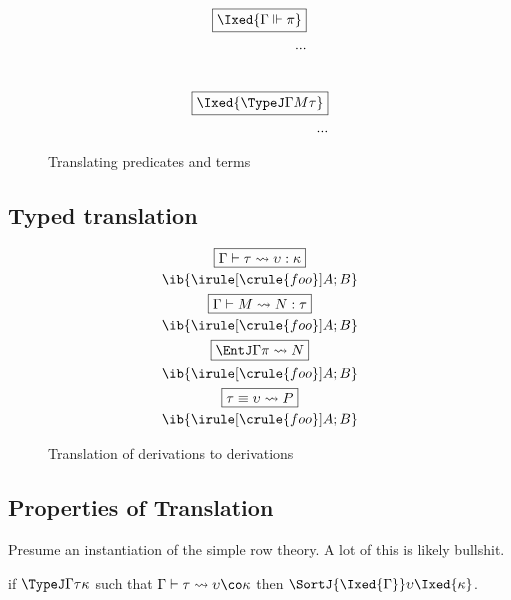 \documentclass[authoryear,acmsmall,screen]{acmart}
\begin{document}
\begin{figure}[H]
\begin{align*}
\fbox{$\Ixed{\Gamma \Vdash \pi}$} \\
\vspace{5em}
...
\end{align*} \\
\begin{align*}
\fbox{$\Ixed{\TypeJ \Gamma M \tau}$} \\
\vspace{5em}
...
\end{align*}
\caption{Translating predicates and terms}
\label{fig:translation}
\end{figure}

\subsection{Typed translation}

\begin{figure}[H]
\small
\begin{gather*}
\fbox{$\Gamma \vdash \tau \leadsto \upsilon : \kappa$}
\\
\ib{\irule[\crule{foo}]{A};{B}} \\
\fbox{$\Gamma \vdash M \leadsto N : \tau$}
\\
\ib{\irule[\crule{foo}]{A};{B}} \\
\fbox{${\EntJ \Gamma \pi} \leadsto N$}
\\
\ib{\irule[\crule{foo}]{A};{B}}  \\
\fbox{${\tau \equiv \upsilon} \leadsto P$}
\\
\ib{\irule[\crule{foo}]{A};{B}} 
\end{gather*}
\caption{Translation of \RO derivations to \IX{} derivations}
\end{figure}

\subsection{Properties of Translation}

Presume an \RO instantiation of the simple row theory. A lot of this is likely bullshit.

\begin{theorem}
  if $\TypeJ \Gamma \tau \kappa$ such that $\Gamma \vdash \tau \leadsto \upsilon \co \kappa$ then $\SortJ {\Ixed{\Gamma}} \upsilon {\Ixed{\kappa}}$.
\end{theorem}
\end{document}
